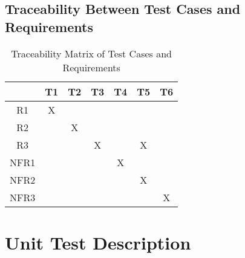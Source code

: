 \documentclass[12pt, titlepage]{article}
\begin{document}

    					
    					
    					
    					

\subsection{Traceability Between Test Cases and Requirements}

\begin{table}[h!]
  \centering
  \begin{tabular}{|c|c|c|c|c|c|c|}
  \hline
    & T1 & T2 & T3 & T4 & T5 & T6 \\
  \hline
  R1        & X  &   &   &   &   &   \\ \hline
  R2        &   & X  &   &   &   &   \\ \hline
  R3        &   &   & X  &   & X  &   \\ \hline
  NFR1      &   &   &   & X  &   &   \\ \hline
  NFR2      &   &   &   &   &  X &   \\ \hline
  NFR3      &   &   &   &   &   & X  \\ \hline
  \end{tabular}
  \caption{Traceability Matrix of Test Cases and Requirements}
  \label{Table:trace-test-req}
  \end{table}


\section{Unit Test Description}


\end{document}
